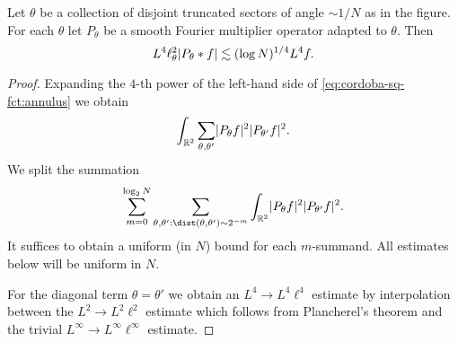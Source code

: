 \begin{proposition}
Let $\theta$ be a collection of disjoint truncated sectors of angle $\sim 1/N$ as in the figure.
For each $\theta$ let $P_{\theta}$ be a smooth Fourier multiplier operator adapted to $\theta$.
Then
\begin{equation}
\label{eq:cordoba-sq-fct:annulus}
L^{4} \ell^{2}_{\theta} \lvert P_{\theta} * f\rvert
\lesssim
(\log N)^{1/4}
L^{4} f.
\end{equation}
\end{proposition}
\begin{proof}
Expanding the $4$-th power of the left-hand side of \eqref{eq:cordoba-sq-fct:annulus} we obtain
\[
\int_{\mathbb{R}^{2}} \sum_{\theta,\theta'} \lvert P_{\theta}f\rvert^{2} \lvert P_{\theta'}f\rvert^{2}.
\]
We split the summation
\[
\sum_{m=0}^{\log_{2} N} \sum_{\theta,\theta' : \dist(\theta,\theta') \sim 2^{-m}} \int_{\R^{2}} \abs{P_{\theta}f}^{2} \abs{P_{\theta'}f}^{2}.
\]
It suffices to obtain a uniform (in $N$) bound for each $m$-summand.
All estimates below will be uniform in $N$.

For the diagonal term $\theta=\theta'$ we obtain an $L^{4} \to L^{4}\ell^{4}$ estimate by interpolation between the $L^{2}\to L^{2}\ell^{2}$ estimate which follows from Plancherel's theorem and the trivial $L^{\infty} \to L^{\infty}\ell^{\infty}$ estimate.


\end{proof}

